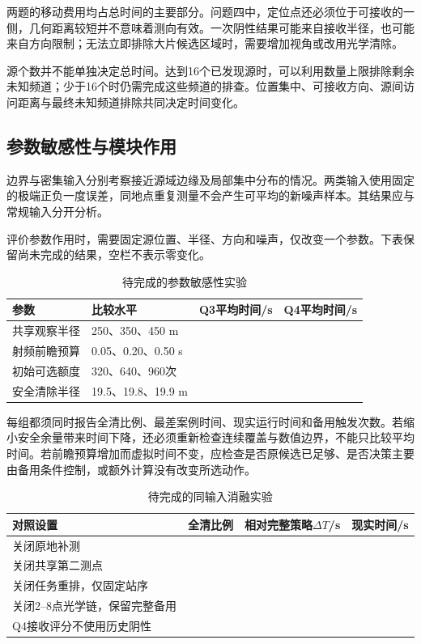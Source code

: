 \documentclass[UTF8,a4paper,12pt,fontset=fandol]{ctexart}
\newcommand{\blank}{\underline{\hspace{1.4cm}}}
\newcommand{\nextpage}{\clearpage}
\begin{document}
两题的移动费用均占总时间的主要部分。问题四中，定位点还必须位于可接收的一侧，几何距离较短并不意味着测向有效。一次阴性结果可能来自接收半径，也可能来自方向限制；无法立即排除大片候选区域时，需要增加视角或改用光学清除。

源个数并不能单独决定总时间。达到16个已发现源时，可以利用数量上限排除剩余未知频道；少于16个时仍需完成这些频道的排查。位置集中、可接收方向、源间访问距离与最终未知频道排除共同决定时间变化。

\nextpage
\subsection{参数敏感性与模块作用}
边界与密集输入分别考察接近源域边缘及局部集中分布的情况。两类输入使用固定的极端正负一度误差，同地点重复测量不会产生可平均的新噪声样本。其结果应与常规输入分开分析。

评价参数作用时，需要固定源位置、半径、方向和噪声，仅改变一个参数。下表保留尚未完成的结果，空栏不表示零变化。

\begin{table}[H]\centering\caption{待完成的参数敏感性实验}\small
\begin{tabularx}{\linewidth}{YYcc}\toprule
参数 & 比较水平 & Q3平均时间/s & Q4平均时间/s\\\midrule
共享观察半径 & 250、350、450 m & \blank & \blank\\
射频前瞻预算 & 0.05、0.20、0.50 s & \blank & \blank\\
初始可选额度 & 320、640、960次 & \blank & \blank\\
安全清除半径 & 19.5、19.8、19.9 m & \blank & \blank\\\bottomrule
\end{tabularx}\end{table}

每组都须同时报告全清比例、最差案例时间、现实运行时间和备用触发次数。若缩小安全余量带来时间下降，还必须重新检查连续覆盖与数值边界，不能只比较平均时间。若前瞻预算增加而虚拟时间不变，应检查是否原候选已足够、是否决策主要由备用条件控制，或额外计算没有改变所选动作。

\begin{table}[H]\centering\caption{待完成的同输入消融实验}\small
\begin{tabularx}{\linewidth}{Yccc}\toprule
对照设置 & 全清比例 & 相对完整策略$\Delta T$/s & 现实时间/s\\\midrule
关闭原地补测 & \blank & \blank & \blank\\
关闭共享第二测点 & \blank & \blank & \blank\\
关闭任务重排，仅固定站序 & \blank & \blank & \blank\\
关闭2--8点光学链，保留完整备用 & \blank & \blank & \blank\\
Q4接收评分不使用历史阴性 & \blank & \blank & \blank\\\bottomrule
\end{tabularx}\end{table}
\end{document}
